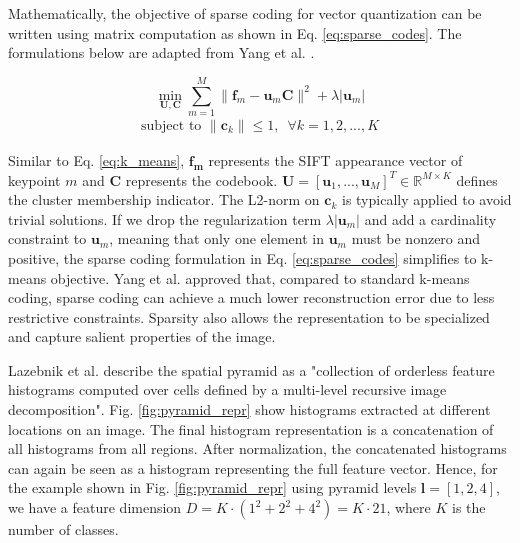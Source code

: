 \endgroup


Mathematically, the objective of sparse coding for vector quantization can be written using matrix computation as shown in Eq. \ref{eq:sparse_codes}. The formulations below are adapted from Yang et al. \cite{yang09}.

\begin{samepage}
\begin{equation}
  \min_{\boldsymbol{U,C}} \sum_{m=1}^M \|\boldsymbol{f}_m - \boldsymbol{u}_m \boldsymbol{C}\|^2 + \lambda |\boldsymbol{u}_m|
  \label{eq:sparse_codes} 
\end{equation}
\begin{align*}
  \textrm{subject to } \|\boldsymbol{c}_k\| \leq 1, \hspace{6pt} \forall{k} = 1,2,...,K
\end{align*}
\end{samepage}

Similar to Eq. \ref{eq:k_means}, $\boldsymbol{f_m}$ represents the SIFT appearance vector of keypoint $m$ and $\boldsymbol{C}$ represents the codebook. $\boldsymbol{U} = [\boldsymbol{u}_1,...,\boldsymbol{u}_M]^T \in \mathbb{R}^{M \times K}$ defines the cluster membership indicator. The L2-norm on $\boldsymbol{c}_k$ is typically applied to avoid trivial solutions. If we drop the regularization term $\lambda |\boldsymbol{u}_m|$ and add a cardinality constraint to $\boldsymbol{u}_m$, meaning that only one element in $\boldsymbol{u}_m$ must be nonzero and positive, the sparse coding formulation in Eq. \ref{eq:sparse_codes} simplifies to k-means objective. Yang et al. \cite{yang09} approved that, compared to standard k-means coding, sparse coding can achieve a much lower reconstruction error due to less restrictive constraints. Sparsity also allows the representation to be specialized and capture salient properties of the image.

Lazebnik et al. \cite{lazebnik09} describe the spatial pyramid as a "collection of orderless feature histograms computed over cells defined by a multi-level recursive image decomposition". Fig. \ref{fig:pyramid_repr} show histograms extracted at different locations on an image. The final histogram representation is a concatenation of all histograms from all regions. After normalization, the concatenated histograms can again be seen as a histogram representing the full feature vector. Hence, for the example shown in Fig. \ref{fig:pyramid_repr} using pyramid levels $\boldsymbol{l} = [1,2,4]$, we have a feature dimension $D = K \cdot (1^2 + 2^2 + 4^2) = K \cdot 21$, where $K$ is the number of classes.

